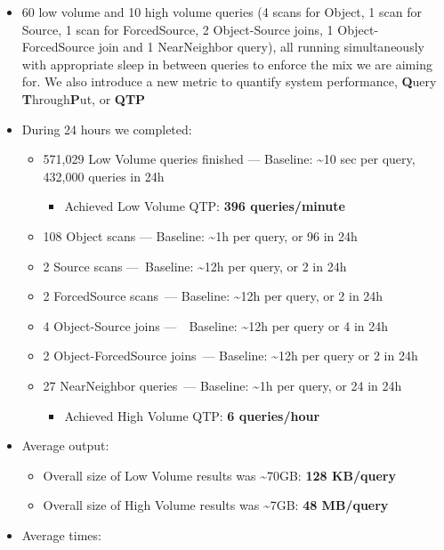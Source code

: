 \begin{itemize}
\item
  60 low volume and 10 high volume queries (4 scans for Object, 1 scan
  for Source, 1 scan for ForcedSource, 2 Object-Source joins, 1
  Object-ForcedSource join and 1 NearNeighbor query), all running
  simultaneously with appropriate sleep in between queries to enforce
  the mix we are aiming for. We also introduce a new metric to quantify
  system performance, \textbf{Q}uery \textbf{T}hrough\textbf{P}ut, or
  \textbf{QTP}
\item
  During 24 hours we completed:

  \begin{itemize}
  \item
    571,029 Low Volume queries finished --- Baseline:
    \textasciitilde{}10 sec per query, 432,000 queries in 24h

    \begin{itemize}
    \item
      Achieved Low Volume QTP: \textbf{396 queries/minute}
    \end{itemize}
  \item
    108 Object scans --- Baseline: \textasciitilde{}1h per query, or 96
    in 24h
  \item
    2 Source scans ---~Baseline: \textasciitilde{}12h per query, or 2 in
    24h
  \item
    2 ForcedSource scans~--- Baseline: \textasciitilde{}12h per query,
    or 2 in 24h
  \item
    4 Object-Source joins ---~~Baseline: \textasciitilde{}12h per query
    or 4 in 24h
  \item
    2 Object-ForcedSource joins~--- Baseline: \textasciitilde{}12h per
    query or 2 in 24h
  \item
    27 NearNeighbor queries~--- Baseline: \textasciitilde{}1h per query,
    or 24 in 24h

    \begin{itemize}
    \item
      Achieved High Volume QTP: \textbf{6 queries/hour}
    \end{itemize}
  \end{itemize}
\item
  Average output:

  \begin{itemize}
  \item
    Overall size of Low Volume results was \textasciitilde{}70GB:
    \textbf{128 KB/query}
  \item
    Overall size of High Volume results was \textasciitilde{}7GB:
    \textbf{48 MB/query}
  \end{itemize}
\item
  Average times:


\end{itemize}
